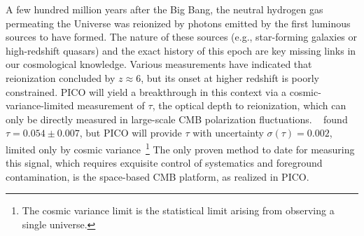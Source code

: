 \documentclass[PICOReport.tex]{subfiles}
\begin{document}
A few hundred million years after the Big Bang, the neutral hydrogen gas permeating the Universe was reionized by photons emitted by the first luminous sources to have formed.  The nature of these sources (e.g., star-forming galaxies or high-redshift quasars) and the exact history of this epoch are key missing links in our cosmological knowledge.  Various measurements have indicated that reionization concluded by $z \approx 6$, but its onset at higher redshift is poorly constrained.  PICO will yield a breakthrough in this context via a cosmic-variance-limited measurement of $\tau$, the optical depth to reionization, which can only be directly measured in large-scale CMB polarization fluctuations.  \planck~ found $\tau = 0.054 \pm 0.007$, but PICO will provide $\tau$ with uncertainty $\sigma (\tau) = 0.002$, limited only by cosmic variance~\footnote{The cosmic variance limit is the statistical limit arising from observing a single universe.}  The only proven method to date for measuring this signal, which requires exquisite control of systematics and foreground contamination, is the space-based CMB platform, as realized in PICO.

\end{document}
